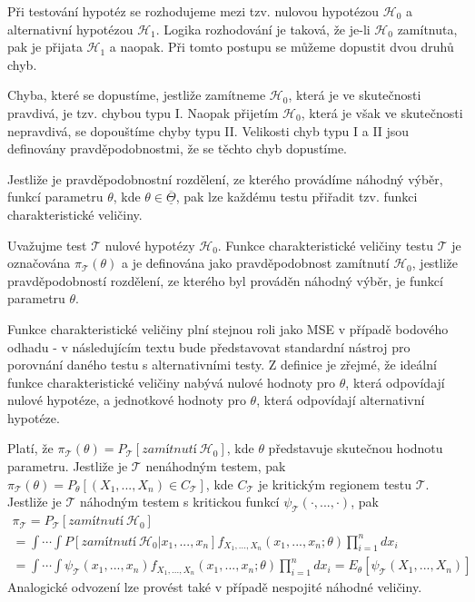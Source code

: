 Při testování hypotéz se rozhodujeme mezi tzv. nulovou hypotézou $\mathscr{H}_0$ a alternativní hypotézou $\mathscr{H}_1$. Logika rozhodování je taková, že je-li $\mathscr{H}_0$ zamítnuta, pak je přijata $\mathscr{H}_1$ a naopak. Při tomto postupu se můžeme dopustit dvou druhů chyb.

\begin{definition}
Chyba, které se dopustíme, jestliže zamítneme $\mathscr{H}_0$, která je ve skutečnosti pravdivá, je tzv. chybou typu I. Naopak přijetím $\mathscr{H}_0$, která je však ve skutečnosti nepravdivá, se dopouštíme chyby typu II. Velikosti chyb typu I a II jsou definovány pravděpodobnostmi, že se těchto chyb dopustíme.
\end{definition}

Jestliže je pravděpodobnostní rozdělení, ze kterého provádíme náhodný výběr, funkcí parametru $\theta$, kde $\theta \in \overline{\underline{\Theta}}$, pak lze každému testu přiřadit tzv. funkci charakteristické veličiny.

\begin{definition}
Uvažujme test $\mathscr{T}$ nulové hypotézy $\mathscr{H}_0$. Funkce charakteristické veličiny testu $\mathscr{T}$ je označována $\pi_{\mathscr{T}}(\theta)$ a je definována jako pravděpodobnost zamítnutí $\mathscr{H}_0$, jestliže pravděpodobností rozdělení, ze kterého byl prováděn náhodný výběr, je funkcí parametru $\theta$.
\end{definition}

Funkce charakteristické veličiny plní stejnou roli jako MSE v případě bodového odhadu - v následujícím textu bude představovat standardní nástroj pro porovnání daného testu s alternativními testy. Z definice je zřejmé, že ideální funkce charakteristické veličiny nabývá nulové hodnoty pro $\theta$, která odpovídají nulové hypotéze, a jednotkové hodnoty pro $\theta$, která odpovídají alternativní hypotéze.

Platí, že $\pi_{\mathscr{T}}(\theta) = P_{\mathscr{T}}[\textit{zamítnutí}~\mathscr{H}_0]$, kde $\theta$ představuje skutečnou hodnotu parametru. Jestliže je $\mathscr{T}$ nenáhodným testem, pak $\pi_{\mathscr{T}}(\theta) = P_{\theta}[(X_1, ..., X_n) \in C_{\mathscr{T}}]$, kde $C_{\mathscr{T}}$ je kritickým regionem testu $\mathscr{T}$. Jestliže je $\mathscr{T}$ náhodným testem s kritickou funkcí $\psi_{\mathscr{T}}(\cdot, ..., \cdot)$, pak
\begin{multline*}
\pi_{\mathscr{T}} = P_{\mathscr{T}}[\textit{zamítnutí}~\mathscr{H}_0]\\
= \int \cdots \int P[\textit{zamítnutí}~\mathscr{H}_0 | x_1, ..., x_n]f_{X_1, ..., X_n}(x_1, ..., x_n; \theta) \prod_{i = 1}^n d x_i\\
= \int \cdots \int \psi_{\mathscr{T}}(x_1, ..., x_n)f_{X_1, ..., X_n}(x_1, ..., x_n; \theta)\prod_{i = 1}^n d x_i = E_{\theta}[\psi_{\mathscr{T}}(X_1, ..., X_n)]
\end{multline*}
Analogické odvození lze provést také v případě nespojité náhodné veličiny.

